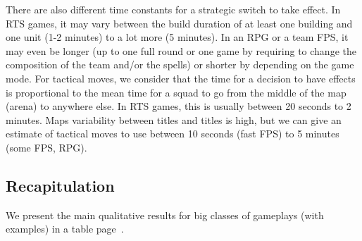 There are also different time constants for a strategic switch to take effect. In RTS games, it may vary between the build duration of at least one building and one unit (1-2 minutes) to a lot more (5 minutes). In an RPG or a team FPS, it may even be longer (up to one full round or one game by requiring to change the composition of the team and/or the spells) or shorter by depending on the game mode. For tactical moves, we consider that the time for a decision to have effects is proportional to the mean time for a squad to go from the middle of the map (arena) to anywhere else. In RTS games, this is usually between 20 seconds to 2 minutes. Maps variability between  titles and  titles is high, but we can give an estimate of tactical moves to use between 10 seconds (fast FPS) to 5 minutes (some FPS, RPG).


\subsection{Recapitulation}

We present the main qualitative results for big classes of gameplays (with examples) in a table page~\pageref{recapgames}.

